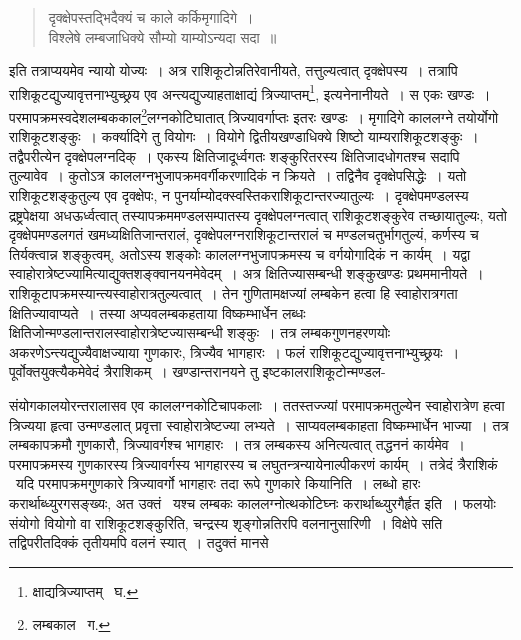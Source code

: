 \documentclass[11pt, openany]{book}
\begin{document}
\begin{quote}
{\qt दृक्क्षेपस्तद्भिदैक्यं च काले कर्किमृगादिगे~।\\
विश्लेषे लम्बजाधिक्ये सौम्यो याम्योऽन्यदा सदा~॥}
\end{quote}
\begin{sloppypar} 
\noindent इति तत्राप्ययमेव न्यायो योज्यः~। अत्र राशिकूटोन्नतिरेवानीयते, तत्तुल्यत्वात् दृक्क्षेपस्य~। तत्रापि राशिकूटद्युज्यावृत्तनाभ्युच्छ्रय
एव {\qt अन्त्यद्युज्याहताक्षाद्यं त्रिज्याप्तम्}\renewcommand{\thefootnote}{१}\footnote{क्षाद्यत्रिज्याप्तम् \textendash\ घ.}, इत्यनेनानीयते~। स एकः खण्डः~। परमापक्रमस्वदेशलम्बककाल\renewcommand{\thefootnote}{२}\footnote{लम्बकाल \textendash\ ग.}लग्नकोटिघातात् त्रिज्यावर्गाप्तः इतरः खण्डः~। मृगादिगे काललग्ने तयोर्योगो राशिकूटशङ्कुः~। कर्क्यादिगे तु वियोगः~। वियोगे द्वितीयखण्डाधिक्ये शिष्टो याम्यराशिकूटशङ्कुः~। तद्वैपरीत्येन दृक्क्षेपलग्नदिक्~। एकस्य क्षितिजादूर्ध्वगतः शङ्कुरितरस्य क्षितिजादधोगतश्च सदापि तुल्यावेव~। कुतोऽत्र काललग्नभुजापक्रमवर्गीकरणादिकं न क्रियते~। तद्विनैव दृक्क्षेपसिद्धेः~। यतो राशिकूटशङ्कुतुल्य एव दृक्क्षेपः, न पुनर्याम्योदक्स्वस्तिकराशिकूटान्तरज्यातुल्यः~। दृक्क्षेपमण्डलस्य द्रष्ट्रपेक्षया अधऊर्ध्वत्वात् तस्यापक्रममण्डलसम्पातस्य दृक्क्षेपलग्नत्वात् राशिकूटशङ्कुरेव तच्छायातुल्यः, यतो दृक्क्षेपमण्डलगतं खमध्यक्षितिजान्तरालं, दृक्क्षेपलग्नराशिकूटान्तरालं च मण्डलचतुर्भागतुल्यं,
कर्णस्य च तिर्यक्त्वान्न शङ्कुत्वम्, अतोऽस्य शङ्कोः काललग्नभुजापक्रमस्य च वर्गयोगादिकं न कार्यम्~। यद्वा
स्वाहोरात्रेष्टज्यामित्याद्युक्तशङ्क्वानयनमेवेदम्~। अत्र क्षितिज्यासम्बन्धी शङ्कुखण्डः प्रथममानीयते~।
राशिकूटापक्रमस्यान्त्यस्वाहोरात्रतुल्यत्वात्~। तेन गुणितामक्षज्यां लम्बकेन हत्वा हि स्वाहोरात्रगता क्षितिज्यावाप्यते~। तस्या अप्यवलम्बकहताया
विष्कम्भार्धेन लब्धः क्षितिजोन्मण्डलान्तरालस्वाहोरात्रेष्टज्यासम्बन्धी शङ्कुः~। तत्र लम्बकगुणनहरणयोः अकरणेऽन्त्यद्युज्यैवाक्षज्याया गुणकारः, त्रिज्यैव भागहारः~। फलं राशिकूटद्युज्यावृत्तनाभ्युच्छ्रयः~। पूर्वोक्तयुक्त्यैकमेवेदं त्रैराशिकम्~। खण्डान्तरानयने तु इष्टकालराशिकूटोन्मण्डल- 
\end{sloppypar} 
\newpage

\noindent संयोगकालयोरन्तरालासव एव काललग्नकोटिचापकलाः~। ततस्तज्ज्यां परमापक्रमतुल्येन स्वाहोरात्रेण हत्वा त्रिज्यया हृत्वा उन्मण्डलात् प्रवृत्ता स्वाहोरात्रेष्टज्या लभ्यते~। साप्यवलम्बकाहता विष्कम्भार्धेन भाज्या~। तत्र लम्बकापक्रमौ गुणकारौ, त्रिज्यावर्गश्च भागहारः~। तत्र लम्बकस्य अनित्यत्वात् तद्धननं कार्यमेव~। परमापक्रमस्य गुणकारस्य त्रिज्यावर्गस्य भागहारस्य च लघुतन्त्रन्यायेनाल्पीकरणं कार्यम्~। तत्रेदं त्रैराशिकं \textendash\ यदि परमापक्रमगुणकारे त्रिज्यावर्गो भागहारः तदा रूपे गुणकारे कियानिति~। लब्धो हारः करार्थाब्ध्युरगसङ्ख्यः, अत उक्तं \textendash\ {\qt यश्च लम्बकः काललग्नोत्थकोटिघ्नः करार्थाब्ध्युरगैर्हृत} इति~। फलयोः संयोगो वियोगो वा राशिकूटशङ्कुरिति, चन्द्रस्य शृङ्गोन्नतिरपि वलनानुसारिणी~। विक्षेपे सति तद्विपरीतदिक्कं तृतीयमपि वलनं स्यात्~। तदुक्तं मानसे \textendash  
\end{document}
